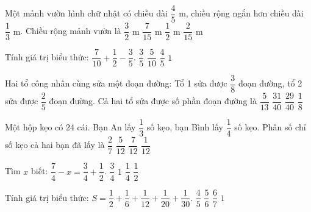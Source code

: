 \begin{ex} %
Một mảnh vườn hình chữ nhật có chiều dài $\dfrac{4}{5}\text{ m}$, chiều rộng ngắn hơn chiều dài $\dfrac{1}{3}\text{ m}$. Chiều rộng mảnh vườn là
\choice
{$\dfrac{3}{2}\text{ m}$}
{\True $\dfrac{7}{15}\text{ m}$}
{$\dfrac{1}{2}\text{ m}$}
{$\dfrac{2}{15}\text{ m}$}
\end{ex}

\begin{ex} %
Tính giá trị biểu thức: $\dfrac{7}{10} + \dfrac{1}{2} - \dfrac{3}{5}$.
\choice
{\True $\dfrac{3}{5}$}
{$\dfrac{5}{10}$}
{$\dfrac{4}{5}$}
{$1$}
\end{ex}

\begin{ex} %
Hai tổ công nhân cùng sửa một đoạn đường: Tổ 1 sửa được $\dfrac{3}{8}$ đoạn đường, tổ 2 sửa được $\dfrac{2}{5}$ đoạn đường. Cả hai tổ sửa được số phần đoạn đường là
\choice
{$\dfrac{5}{13}$}
{\True $\dfrac{31}{40}$}
{$\dfrac{29}{40}$}
{$\dfrac{1}{8}$}
\end{ex}

\begin{ex} %
Một hộp kẹo có 24 cái. Bạn An lấy $\dfrac{1}{3}$ số kẹo, bạn Bình lấy $\dfrac{1}{4}$ số kẹo. Phân số chỉ số kẹo cả hai bạn đã lấy là
\choice
{$\dfrac{2}{7}$}
{$\dfrac{5}{12}$}
{\True $\dfrac{7}{12}$}
{$\dfrac{1}{12}$}
\end{ex}

\begin{ex} %
Tìm $x$ biết: $\dfrac{7}{4} - x = \dfrac{3}{4} + \dfrac{1}{2}$.
\choice
{$\dfrac{3}{4}$}
{$1$}
{$\dfrac{1}{4}$}
{\True $\dfrac{1}{2}$}
\end{ex}

\begin{ex} %
Tính giá trị biểu thức: $S = \dfrac{1}{2} + \dfrac{1}{6} + \dfrac{1}{12} + \dfrac{1}{20} + \dfrac{1}{30}$.
\choice
{$\dfrac{4}{5}$}
{\True $\dfrac{5}{6}$}
{$\dfrac{6}{7}$}
{$1$}
\end{ex}

